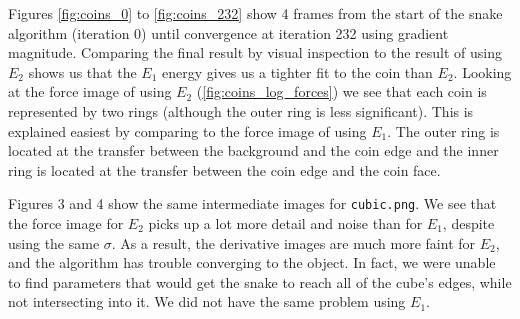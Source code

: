 \documentclass[11pt,a4paper]{article}
\begin{document}
Figures \ref{fig:coins_0} to \ref{fig:coins_232} show 4 frames from the start
of the snake algorithm (iteration 0) until convergence at iteration 232 using
gradient magnitude. Comparing the final result by visual inspection to the
result of using $E_2$ shows us that the $E_1$ energy gives us a tighter fit to
the coin than $E_2$. Looking at the force image of using $E_2$
(\ref{fig:coins_log_forces}) we see that each coin is represented by two rings
(although the outer ring is less significant). This is explained easiest by
comparing to the force image of using $E_1$. The outer ring is located at
the transfer between the background and the coin edge and the inner ring is
located at the transfer between the coin edge and the coin face.

Figures 3 and 4 show the same intermediate images for \texttt{cubic.png}. We see that the force image for $E_2$ picks up a lot more detail and noise than for $E_1$, despite using the same $\sigma$. As a result, the derivative images are much more faint for $E_2$, and the algorithm has trouble converging to the object. In fact, we were unable to find parameters that would get the snake to reach all of the cube's edges, while not intersecting into it. We did not have the same problem using $E_1$.
\end{document}
